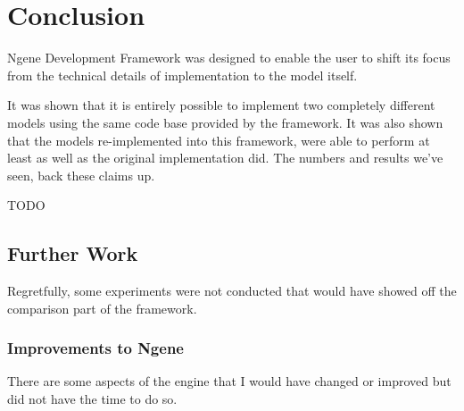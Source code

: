 \section{Conclusion}
Ngene Development Framework was designed to enable the user to shift its focus from the technical details of implementation to the model itself.

It was shown that it is entirely possible to implement two completely different models using the same code base provided by the framework. It was also shown that the models re-implemented into this framework, were able to perform at least as well as the original implementation did. The numbers and results we've seen, back these claims up.

TODO


\subsection{Further Work}

Regretfully, some experiments were not conducted that would have showed off the comparison part of the framework.

\subsubsection{Improvements to Ngene}
\label{sec:improvements}
There are some aspects of the engine that I would have changed or improved but did not have the time to do so.

